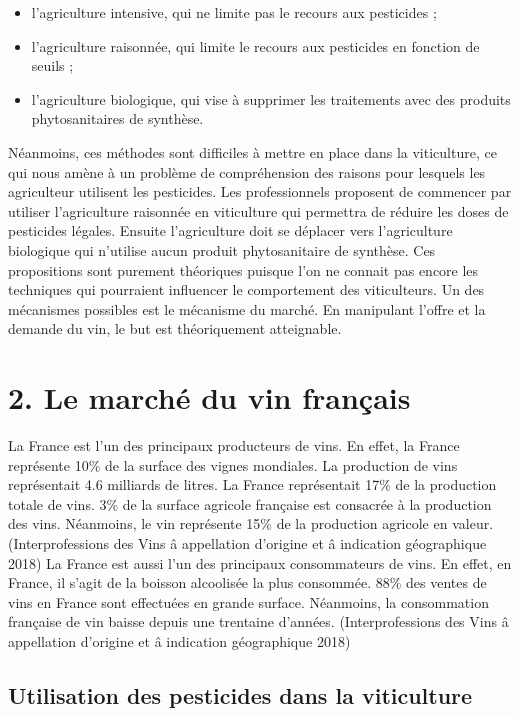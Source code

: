 \documentclass[11pt,]{article}
\providecommand{\tightlist}{%
  \setlength{\itemsep}{0pt}\setlength{\parskip}{0pt}}
\begin{document}
\begin{itemize}
\tightlist
\item
  l'agriculture intensive, qui ne limite pas le recours aux pesticides ;
\item
  l'agriculture raisonnée, qui limite le recours aux pesticides en
  fonction de seuils ;
\item
  l'agriculture biologique, qui vise à supprimer les traitements avec
  des produits phytosanitaires de synthèse.
\end{itemize}

Néanmoins, ces méthodes sont difficiles à mettre en place dans la
viticulture, ce qui nous amène à un problème de compréhension des
raisons pour lesquels les agriculteur utilisent les pesticides. Les
professionnels proposent de commencer par utiliser l'agriculture
raisonnée en viticulture qui permettra de réduire les doses de
pesticides légales. Ensuite l'agriculture doit se déplacer vers
l'agriculture biologique qui n'utilise aucun produit phytosanitaire de
synthèse. Ces propositions sont purement théoriques puisque l'on ne
connait pas encore les techniques qui pourraient influencer le
comportement des viticulteurs. Un des mécanismes possibles est le
mécanisme du marché. En manipulant l'offre et la demande du vin, le but
est théoriquement atteignable.

\hypertarget{le-marche-du-vin-francais}{%
\section{2. Le marché du vin français}\label{le-marche-du-vin-francais}}

La France est l'un des principaux producteurs de vins. En effet, la
France représente 10\% de la surface des vignes mondiales. La production
de vins représentait 4.6 milliards de litres. La France représentait
17\% de la production totale de vins. 3\% de la surface agricole
française est consacrée à la production des vins. Néanmoins, le vin
représente 15\% de la production agricole en valeur. (Interprofessions
des Vins â appellation d'origine et â indication géographique 2018) La
France est aussi l'un des principaux consommateurs de vins. En effet, en
France, il s'agit de la boisson alcoolisée la plus consommée. 88\% des
ventes de vins en France sont effectuées en grande surface. Néanmoins,
la consommation française de vin baisse depuis une trentaine d'années.
(Interprofessions des Vins â appellation d'origine et â indication
géographique 2018)

\hypertarget{utilisation-des-pesticides-dans-la-viticulture}{%
\subsection{Utilisation des pesticides dans la
viticulture}\label{utilisation-des-pesticides-dans-la-viticulture}}
\end{document}
